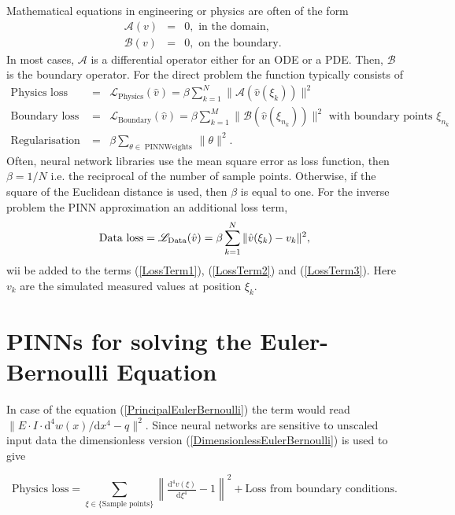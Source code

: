 \documentclass[a4paper,11pt]{article}
\begin{document}
Mathematical equations in engineering or physics are often of the form
\begin{eqnarray*}
\mathscr{A} (v) &=& 0,\text{ in the domain,} \\
\mathscr{B} (v) &=& 0,\text{ on the boundary. }
\end{eqnarray*}
In most cases, $ \mathscr{A} $ is a differential operator either for an ODE or a PDE. Then, $ \mathscr{B} $ is the boundary operator. For the direct problem the function typically consists of
\begin{eqnarray} \label{LossTerm1}
\text{Physics loss } &=& \mathscr{L}_{\operatorname{Physics}} (\hat{v}) =\beta \sum_{k = 1}^N\| \mathscr{A} (\hat{v}(\xi_k) ) \|^2 \\
\text{Boundary loss} &=& \mathscr{L}_{\operatorname{Boundary}} (\hat{v}) = \beta \sum_{k = 1}^M\| \mathscr{B} (\hat{v}(\xi_{n_k}) ) \|^2 \text{ with boundary points  } \xi_{n_k} \label{LossTerm2}\\
\text{Regularisation term} &=& \beta \sum_{\theta \in \operatorname{PINN Weights}}  \| \theta \|^2 . \label{LossTerm3}
\end{eqnarray}
Often, neural network libraries use the mean square error as loss function, then $\beta = 1 /N  $ i.e. the reciprocal of the number of sample points. Otherwise, if the square of the Euclidean distance is used, then $\beta $ is equal to one.
For the inverse problem the PINN approximation an additional loss term,
\begin{equation*}
\text{Data loss} = \mathscr{L}_{\operatorname{Data}} (\hat{v})  = \beta \sum_{k = 1}^N \| \hat{v}(\xi_k)  - v_k \|^2 \\,
\end{equation*}
wii be added to the terms (\ref{LossTerm1}),  (\ref{LossTerm2}) and (\ref{LossTerm3}). Here $ v_k $ are the simulated measured values at position $\xi_k $.

\section{PINNs for solving the Euler-Bernoulli Equation}
In case of the equation (\ref{PrincipalEulerBernoulli}) the term would read $\| E\cdot I \cdot \mathrm{d}^4 w(x) / \mathrm{d}x^4 - q \|^2 $. Since neural networks are sensitive to unscaled input data the dimensionless version (\ref{DimensionlessEulerBernoulli}) is used to give 

\begin{equation*}
\text{Physics loss} = \sum_{\xi \in \{\text{Sample points}\}} \left\| \tfrac{\mathrm{d}^4 v(\xi)}{\mathrm{d}\xi^4} -1 \right\|^2 + \text{Loss from boundary conditions}.
\end{equation*}
\end{document}
